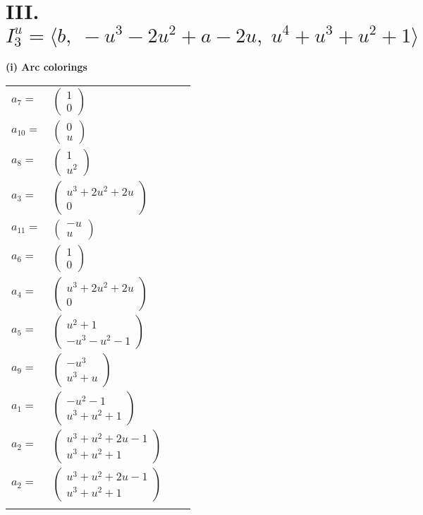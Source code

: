 \documentclass[1p]{elsarticle_modified}
\theoremstyle{definition}
\begin{document}
\centering \section*{III. $I^u_{3}= \langle b,\;- u^3-2 u^2+a-2 u,\;u^4+u^3+u^2+1 \rangle$}
\flushleft \textbf{(i) Arc colorings}\\
\begin{tabular}{m{7pt} m{180pt} m{7pt} m{180pt} }
\flushright $a_{7}=$&$\begin{pmatrix}1\\0\end{pmatrix}$ \\
\flushright $a_{10}=$&$\begin{pmatrix}0\\u\end{pmatrix}$ \\
\flushright $a_{8}=$&$\begin{pmatrix}1\\u^2\end{pmatrix}$ \\
\flushright $a_{3}=$&$\begin{pmatrix}u^3+2 u^2+2 u\\0\end{pmatrix}$ \\
\flushright $a_{11}=$&$\begin{pmatrix}- u\\u\end{pmatrix}$ \\
\flushright $a_{6}=$&$\begin{pmatrix}1\\0\end{pmatrix}$ \\
\flushright $a_{4}=$&$\begin{pmatrix}u^3+2 u^2+2 u\\0\end{pmatrix}$ \\
\flushright $a_{5}=$&$\begin{pmatrix}u^2+1\\- u^3- u^2-1\end{pmatrix}$ \\
\flushright $a_{9}=$&$\begin{pmatrix}- u^3\\u^3+u\end{pmatrix}$ \\
\flushright $a_{1}=$&$\begin{pmatrix}- u^2-1\\u^3+u^2+1\end{pmatrix}$ \\
\flushright $a_{2}=$&$\begin{pmatrix}u^3+u^2+2 u-1\\u^3+u^2+1\end{pmatrix}$\\ \flushright $a_{2}=$&$\begin{pmatrix}u^3+u^2+2 u-1\\u^3+u^2+1\end{pmatrix}$\\&\end{tabular}
\end{document}

